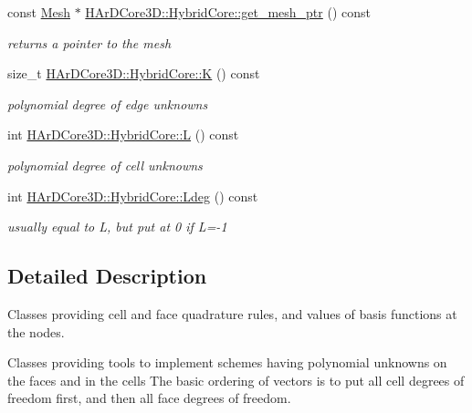 \begin{DoxyCompactItemize}
\mbox{\label{group__HybridCore_gad4c32f117a1e67ec4a13dd9656c404e8}} 
const \hyperlink{classHArDCore3D_1_1Mesh}{Mesh} $\ast$ \hyperlink{group__HybridCore_gad4c32f117a1e67ec4a13dd9656c404e8}{H\+Ar\+D\+Core3\+D\+::\+Hybrid\+Core\+::get\+\_\+mesh\+\_\+ptr} () const
\begin{DoxyCompactList}\small\item\em returns a pointer to the mesh \end{DoxyCompactList}\item 
\mbox{\label{group__HybridCore_ga5c5d20faf615bca6e170961a61464fb2}} 
size\+\_\+t \hyperlink{group__HybridCore_ga5c5d20faf615bca6e170961a61464fb2}{H\+Ar\+D\+Core3\+D\+::\+Hybrid\+Core\+::K} () const
\begin{DoxyCompactList}\small\item\em polynomial degree of edge unknowns \end{DoxyCompactList}\item 
\mbox{\label{group__HybridCore_gae2bb060c207a888bf97a9d2a9626e1c0}} 
int \hyperlink{group__HybridCore_gae2bb060c207a888bf97a9d2a9626e1c0}{H\+Ar\+D\+Core3\+D\+::\+Hybrid\+Core\+::L} () const
\begin{DoxyCompactList}\small\item\em polynomial degree of cell unknowns \end{DoxyCompactList}\item 
\mbox{\label{group__HybridCore_ga907fd6e5325465e94acc67c831a14cdf}} 
int \hyperlink{group__HybridCore_ga907fd6e5325465e94acc67c831a14cdf}{H\+Ar\+D\+Core3\+D\+::\+Hybrid\+Core\+::\+Ldeg} () const
\begin{DoxyCompactList}\small\item\em usually equal to L, but put at 0 if L=-\/1 \end{DoxyCompactList}\end{DoxyCompactItemize}


\subsection{Detailed Description}
Classes providing cell and face quadrature rules, and values of basis functions at the nodes. 

Classes providing tools to implement schemes having polynomial unknowns on the faces and in the cells The basic ordering of vectors is to put all cell degrees of freedom first, and then all face degrees of freedom.

